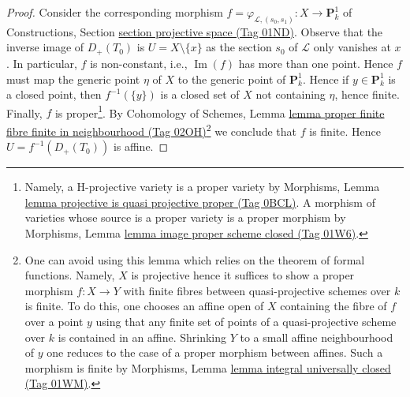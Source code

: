 \documentclass{amsart}
\theoremstyle{plain}
\theoremstyle{definition}
\theoremstyle{remark}
\numberwithin{equation}{subsection}
\def\Im{\mathop{\mathrm{Im}}}
\begin{document}
\begin{proof}
\medskip\noindent
Consider the corresponding morphism
$f = \varphi_{\mathcal{L}, (s_0, s_1)} : X \to \mathbf{P}^1_k$
of Constructions, Section \href{https://stacks.math.columbia.edu/tag/01ND}{section projective space (Tag 01ND)}.
Observe that the inverse image of $D_{+}(T_0)$ is $U = X \setminus \{x\}$
as the section $s_0$ of $\mathcal{L}$ only vanishes at $x$.
In particular, $f$ is non-constant, i.e., $\Im(f)$ has more
than one point. Hence $f$ must map the generic
point $\eta$ of $X$ to the generic point of $\mathbf{P}^1_k$.
Hence if $y \in \mathbf{P}^1_k$ is a closed point, then $f^{-1}(\{y\})$
is a closed set of $X$ not containing $\eta$, hence finite.
Finally, $f$ is proper\footnote{Namely, a H-projective variety
is a proper variety by Morphisms, Lemma
\href{https://stacks.math.columbia.edu/tag/0BCL}{lemma projective is quasi projective proper (Tag 0BCL)}.
A morphism of varieties whose source is a proper variety is a proper morphism
by Morphisms, Lemma \href{https://stacks.math.columbia.edu/tag/01W6}{lemma image proper scheme closed (Tag 01W6)}.}.
By Cohomology of Schemes, Lemma
\href{https://stacks.math.columbia.edu/tag/02OH}{lemma proper finite fibre finite in neighbourhood (Tag 02OH)}\footnote{One
can avoid using this lemma which relies on the theorem of formal
functions. Namely, $X$ is projective hence it suffices to show
a proper morphism $f : X \to Y$ with finite fibres between quasi-projective
schemes over $k$ is finite. To do this, one chooses an affine open of $X$
containing the fibre of $f$ over a point $y$ using that any finite set of
points of a quasi-projective scheme over $k$ is contained in an affine.
Shrinking $Y$ to a small affine neighbourhood of $y$ one reduces to the
case of a proper morphism between affines. Such a morphism is finite by
Morphisms, Lemma \href{https://stacks.math.columbia.edu/tag/01WM}{lemma integral universally closed (Tag 01WM)}.}
we conclude that $f$ is finite. Hence $U = f^{-1}(D_{+}(T_0))$
is affine.
\end{proof}
\end{document}
